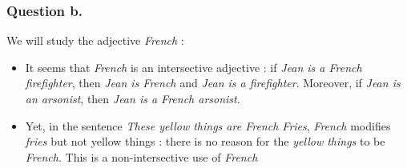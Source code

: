 \documentclass{cours}
\begin{document}
            \subsubsection{Question b.}
                We will study the adjective \textsl{French} :
                \begin{itemize}
                    \item It seems that \textsl{French} is an intersective adjective : if \textsl{Jean is a French firefighter}, then \textsl{Jean is French} and \textsl{Jean is a firefighter}. Moreover, if \textsl{Jean is an arsonist}, then \textsl{Jean is a French arsonist}. 
                    \item Yet, in the sentence \textsl{These yellow things are French Fries}, \textsl{French} modifies \textsl{fries} but not yellow things : there is no reason for the \textsl{yellow things} to be \textsl{French}. This is a non-intersective use of \textsl{French}
                \end{itemize}
\end{document}
